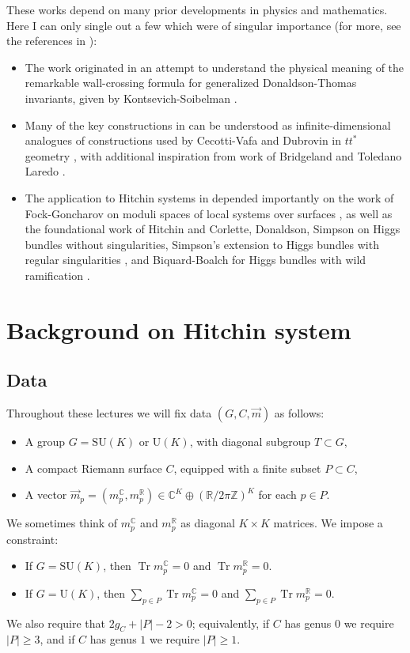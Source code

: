 \documentclass[12pt,letterpaper,reqno]{article}
\numberwithin{equation}{section}
\newcommand{\R}{\ensuremath{\mathbb R}}
\newcommand{\C}{\ensuremath{\mathbb C}}
\newcommand{\Z}{\ensuremath{\mathbb Z}}
\newcommand{\abs}[1]{\lvert#1\rvert}
\DeclareMathOperator{\Tr}{Tr}
\newcommand{\SU}{\mathrm{SU}}
\newcommand{\U}{\mathrm{U}}
\newcommand{\insfig}[2]{

\medskip
\noindent
\begin{minipage}{\linewidth}

\makebox[\linewidth]{\texttt{[image: figures/\#1-crop.pdf]}}

\end{minipage}
\medskip

}
\begin{document}
These works depend on many prior developments
in physics and mathematics. Here I can only single out a few
which were of singular importance (for more, see the references
in \cite{Gaiotto:2008cd,Gaiotto:2009hg}):
\begin{itemize}
\item The work \cite{Gaiotto:2008cd} 
originated in an attempt to understand the physical
meaning of the remarkable wall-crossing formula for generalized
Donaldson-Thomas invariants, given by Kontsevich-Soibelman \cite{ks1}.
\item Many of the key constructions in 
\cite{Gaiotto:2008cd} can
be understood as infinite-dimensional analogues 
of constructions used by Cecotti-Vafa and Dubrovin in 
$tt^*$ geometry \cite{Cecotti:1993rm,MR1213301}, with
additional inspiration from work of Bridgeland and 
Toledano Laredo \cite{stab-stokes}.
\item The application to Hitchin systems
in \cite{Gaiotto:2009hg} depended importantly on
the work of Fock-Goncharov on moduli spaces
of local systems over surfaces \cite{MR2233852},
as well as the foundational work
of Hitchin \cite{MR89a:32021} and Corlette, Donaldson, Simpson
\cite{MR965220,MR887285,MR944577} on Higgs bundles without
singularities, Simpson's extension to 
Higgs bundles with regular 
singularities \cite{hbnc}, and Biquard-Boalch for Higgs
bundles with wild ramification \cite{wnh}.
\end{itemize}

\section{Background on Hitchin system}

\subsection{Data}

Throughout these lectures we will fix data $(G,C,\vec m)$ as follows:
\begin{itemize}
  \item A group $G = \SU(K)$ or $\U(K)$, with diagonal subgroup $T \subset G$,
  \item A compact Riemann surface $C$, equipped with a finite subset $P \subset C$,
  \item A vector $\vec{m}_p = (m^\C_p, m^\R_p) \in \C^K \oplus (\R / 2 \pi \Z)^K$ for each $p \in P$.
\end{itemize}
We sometimes think of $m_p^\C$ and $m_p^\R$ as diagonal
$K \times K$ matrices. We impose a constraint:
\begin{itemize}
\item If $G = \SU(K)$, then
$\Tr m_p^\C = 0$ and $\Tr m_p^\R = 0$.
\item If $G = \U(K)$, then 
$\sum_{p \in P} \Tr m_p^\C = 0$ and
$\sum_{p \in P} \Tr m_p^\R = 0$.
\end{itemize}
We also require that $2g_C + \abs{P} - 2 > 0$; equivalently, 
if $C$ has genus $0$ we require $\abs{P} \ge 3$, 
and if $C$ has genus $1$ we require $\abs{P} \ge 1$.
\insfig{higgs-metric-1}{0.8}
\end{document}
